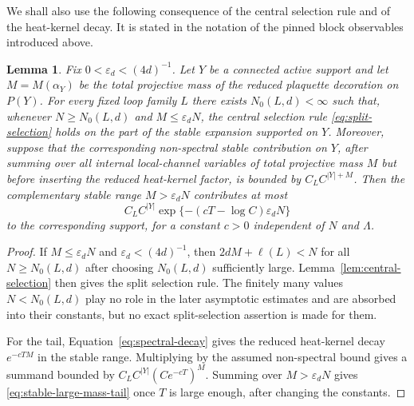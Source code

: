 \documentclass[11pt,a4paper,reqno]{amsart}
\newtheorem{lemma}[theorem]{Lemma}
\theoremstyle{definition}
\theoremstyle{remark}
\begin{document}
We shall also use the following consequence of the central selection rule and of the heat-kernel decay.  It is stated in the notation of the pinned block observables introduced above.

\begin{lemma}\label{lem:central-cutoff}
Fix $0<\varepsilon_d<(4d)^{-1}$.  Let $Y$ be a connected active support and let $M=M(\alpha_Y)$ be the total projective mass of the reduced plaquette decoration on $P(Y)$.  For every fixed loop family $L$ there exists $N_0(L,d)<\infty$ such that, whenever $N\ge N_0(L,d)$ and $M\leq \varepsilon_d N$, the central selection rule \eqref{eq:split-selection} holds on the part of the stable expansion supported on $Y$. Moreover, suppose that the corresponding non-spectral stable contribution on $Y$, after summing over all internal local-channel variables of total projective mass $M$ but before inserting the reduced heat-kernel factor, is bounded by $C_LC^{|Y|+M}$.  Then the complementary stable range $M>\varepsilon_dN$ contributes at most
\begin{equation}\label{eq:stable-large-mass-tail}
C_L C^{|Y|}\exp\{-(cT-\log C)\varepsilon_d N\}
\end{equation}
to the corresponding support, for a constant $c>0$ independent of $N$ and $\Lambda$.
\end{lemma}

\begin{proof}
If $M\leq\varepsilon_dN$ and $\varepsilon_d<(4d)^{-1}$, then $2dM+\ell(L)<N$ for all $N\ge N_0(L,d)$ after choosing $N_0(L,d)$ sufficiently large.  Lemma~\ref{lem:central-selection} then gives the split selection rule.  The finitely many values $N<N_0(L,d)$ play no role in the later asymptotic estimates and are absorbed into their constants, but no exact split-selection assertion is made for them.

For the tail, Equation~\eqref{eq:spectral-decay} gives the reduced heat-kernel decay $e^{-cTM}$ in the stable range.  Multiplying by the assumed non-spectral bound gives a summand bounded by $C_LC^{|Y|}(Ce^{-cT})^M$.  Summing over $M>\varepsilon_dN$ gives \eqref{eq:stable-large-mass-tail} once $T$ is large enough, after changing the constants.
\end{proof}
\end{document}
